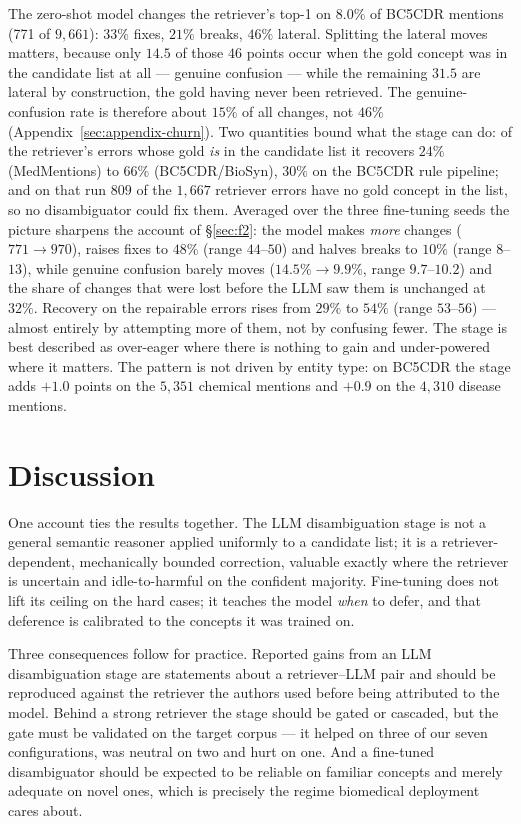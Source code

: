 \documentclass[11pt]{article}
\begin{document}
The zero-shot model changes the retriever's top-1 on $8.0\%$ of BC5CDR mentions (771
of $9{,}661$): $33\%$ fixes, $21\%$ breaks, $46\%$ lateral. Splitting the lateral
moves matters, because only $14.5$ of those $46$ points occur when the gold concept
was in the candidate list at all --- genuine confusion --- while the remaining $31.5$
are lateral by construction, the gold having never been retrieved. The
genuine-confusion rate is therefore about $15\%$ of all changes, not $46\%$
(Appendix~\ref{sec:appendix-churn}). Two quantities bound what the stage can do: of
the retriever's errors whose gold \emph{is} in the candidate list it recovers $24\%$
(MedMentions) to $66\%$ (BC5CDR/BioSyn), $30\%$ on the BC5CDR rule pipeline; and on
that run $809$ of the $1{,}667$ retriever errors have no gold concept in the list, so
no disambiguator could fix them. Averaged over the three fine-tuning seeds the picture
sharpens the account of \S\ref{sec:f2}: the model makes \emph{more} changes ($771 \to
970$), raises fixes to $48\%$ (range $44$--$50$) and halves breaks to $10\%$ (range
$8$--$13$), while genuine confusion barely moves ($14.5\% \to 9.9\%$, range
$9.7$--$10.2$) and the share of changes that were lost before the LLM saw them is
unchanged at $32\%$. Recovery on the repairable errors rises from $29\%$ to $54\%$
(range $53$--$56$) --- almost entirely by attempting more of them, not by confusing
fewer. The stage is best described as
over-eager where there is nothing to gain and under-powered where it matters. The
pattern is not driven by entity type: on BC5CDR the stage adds $+1.0$ points on the
$5{,}351$ chemical mentions and $+0.9$ on the $4{,}310$ disease mentions.

\section{Discussion}

One account ties the results together. The LLM disambiguation stage is not a general
semantic reasoner applied uniformly to a candidate list; it is a
retriever-dependent, mechanically bounded correction, valuable exactly where the
retriever is uncertain and idle-to-harmful on the confident majority. Fine-tuning does
not lift its ceiling on the hard cases; it teaches the model \emph{when} to defer, and
that deference is calibrated to the concepts it was trained on.

Three consequences follow for practice. Reported gains from an LLM disambiguation
stage are statements about a retriever--LLM pair and should be reproduced against the
retriever the authors used before being attributed to the model. Behind a strong
retriever the stage should be gated or cascaded, but the gate must be validated on
the target corpus --- it helped on three of our seven configurations, was neutral on
two and hurt on one. And a fine-tuned disambiguator should be expected to be reliable
on familiar concepts and merely adequate on novel ones, which is precisely the regime
biomedical deployment cares about.
\end{document}
